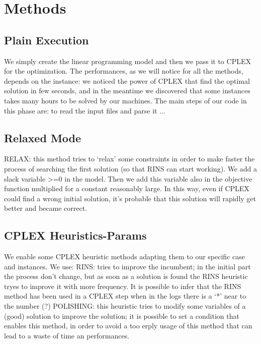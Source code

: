 
\chapter{Methods}

\label{chp:3-Methods}

\section{Plain Execution}
We simply create the linear programming model and then we pass it to CPLEX for the optimization. The performances, as we will notice for all the methods, depends on the instance: we noticed the power of CPLEX that find the optimal solution in few seconds, and in the meantime we discovered that some instances takes many hours to be solved by our machines. 
The main steps of our code in this phase are: 
to read the input files and parse it
...

\section{Relaxed Mode}
RELAX: this method tries to ‘relax’ some constraints in order to make faster the process of searching the first solution (so that RINS can start working). We add a slack variable >=0 in the model. Then we add this variable also in the objective function multiplied for a constant reasonably large. In this way, even if CPLEX could find a wrong initial solution, it’s probable that this solution will rapidly get better and became correct. 
\section{CPLEX Heuristics-Params}
We enable some CPLEX heuristic methods adapting them to our specific case and instances. We use: 
RINS: tries to improve the incumbent; in the initial part the process don’t change, but as soon as a solution is found the RINS heuristic tryes to improve it with more frequency. It is possible to infer that the RINS method has been used in a CPLEX step when in the logs there is a ‘*’ near to the number (?)
POLISHING: this heuristic tries to modify some variables of a (good) solution to improve the solution; it is possible to set a condition that enables this method, in order to avoid a too erply usage of this method that can lead to a waste of time an performances. 

